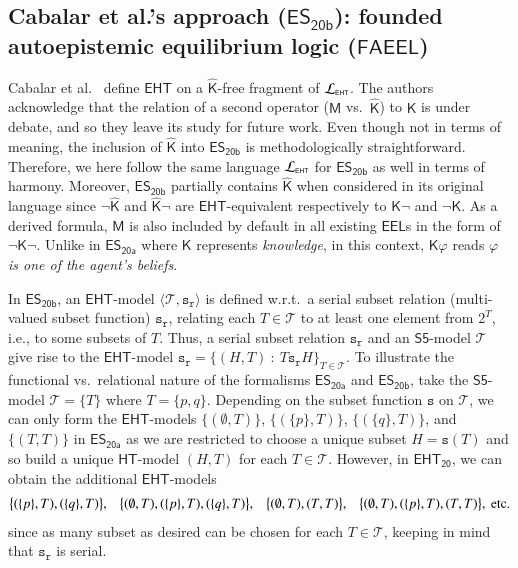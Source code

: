 \documentclass[submission,copyright,creativecommons]{eptcs}
\renewcommand{\phi}  { \varphi }
\newcommand{\lang}[1]  { {\cal L}_{#1} }
\newcommand{\tuple}[1]  { \langle #1 \rangle }
\newcommand{\suchthat}  { \ : \ }
\newcommand{\set}[1]  { \{ #1 \} }
\newcommand{\bigset}[1]  { \big\{ #1 \big\} }
\newcommand{\logic}[1]  { \ensuremath{\mathsf{#1}} }
\newcommand{\sfive}  { \logic{S5} }
\newcommand{\HT}  { \logic{HT} }
\newcommand{\EHT}  { \logic{EHT} }
\newcommand{\EHTyirmib}  { \logic{EHT_{\!\!\scriptscriptstyle{20}} } }
\newcommand{\EEL}  { \logic{EEL} }
\newcommand{\FAEEL}  { \logic{FAEEL} }
\newcommand{\intnot}  { \neg }
\newcommand{\K}  { \mathsf{K} }
\newcommand{\M}  { \mathsf{M} }
\newcommand{\Khat}  { \hat{\mathsf{K}} }
\newcommand{\ESyirmia}  { \logic{ES_{\scriptscriptstyle{20a}} } }
\newcommand{\ESyirmib}  { \logic{ES_{\scriptscriptstyle{20b}} } }
\newcommand{\there}  { \mathcal{T} }
\newcommand{\weak}  { \texttt{s} }
\newcommand{\relational}  { \texttt{r} }
\newcommand{\weakrelational}  { \weak_{\!\relational} }
\begin{document}
\subsection{Cabalar et al.'s approach {\normalfont (\texorpdfstring{$\ESyirmib$}{ESyirmib}):} 
founded autoepistemic equilibrium logic \normalfont (\texorpdfstring{$\FAEEL$}{FAEEL})}
\label{subsec:EEL.CFF}
Cabalar et al.\ \cite{Cabalar20} define $\EHT$ on a $\Khat$-free
fragment of $\lang{\scriptscriptstyle{\EHT}}$. 
The authors acknowledge that the relation of 
a second operator ($\M$ vs.\ $\Khat$) 
to $\K$ is under debate, and so they leave its study for future work. 
Even though not in terms of meaning, the inclusion of $\Khat$ into $\ESyirmib$
is methodologically straightforward. Therefore, we here follow the same language 
$\lang{\scriptscriptstyle{\EHT}}$ for $\ESyirmib$ as well in terms of harmony. 
Moreover,
$\ESyirmib$ partially contains $\Khat$ when considered in its original language 
since $\intnot\Khat$ and $\Khat\intnot$ are $\EHT$-equivalent respectively to $\K \intnot$ and $\intnot\K$. As a derived formula, 
$\M$ is also included by default in all existing $\EEL$s
in the form of $\intnot \K \intnot$. Unlike in $\ESyirmia$ 
where $\K$ represents \emph{knowledge}, in this context,
$\K \phi$ reads \emph{$\phi$ 
is one of the agent's beliefs}. 

In $\ESyirmib$, an $\EHT$-model $\tuple{\there, \weakrelational}$ is defined  
w.r.t.\ a serial subset relation (multi-valued subset function) 
$\weakrelational$,
relating each $T \in \there$ to at least one element from $2^T$, i.e., to some subsets of $T$. Thus, 
a serial subset relation $\weakrelational$ and an $\sfive$-model $\mathcal T$ give rise to the $\EHT$-model
$\weakrelational =\set{(H,T) {\suchthat} T \weakrelational H}_{\scriptscriptstyle{T \in \mathcal T}}$. To illustrate the functional vs.\ relational
nature of the formalisms $\ESyirmia$ and $\ESyirmib$, 
take the $\sfive$-model $\mathcal T=\set{T}$ where $T=\set{p,q}$. Depending on the subset function $\weak$ on $\mathcal T$, we can only form the $\EHT$-models 
$\bigset{ (\emptyset , T)}$,  $\bigset{(\set p, T)}$,
$\bigset{(\set q , T)}$, and $\bigset{(T, T)}$ in $\ESyirmia$ as
we are restricted to choose a unique subset $H=\weak(T)$ and so build a unique $\HT$-model
$(H,T)$ for each $T \in \mathcal T$. However,
in $\EHTyirmib$, we can obtain the additional 
$\EHT$-models
%
\begin{align*}
\bigset{(\set p , T) , (\set q, T)}, \hspace{0.8em} 
\bigset{ (\emptyset, T) , (\set p , T), (\set q, T)}, \hspace{0.8em} 
\bigset{ (\emptyset , T) , (T, T)}, \hspace{0.8em} 
\bigset{ (\emptyset, T) , (\set p , T), (T, T)},  \text{ etc.}
\end{align*}
%
since as many subset as desired can be chosen for each
$T\in \mathcal T$, keeping in mind that $\weakrelational$ is serial.
\end{document}
